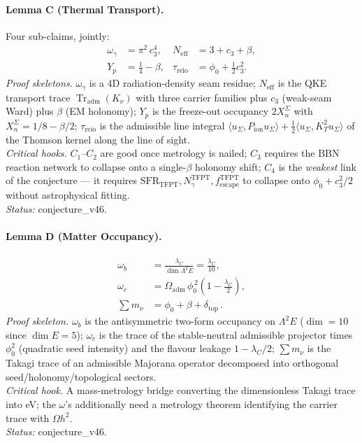 \documentclass[11pt,a4paper]{article}
\begin{document}
\paragraph{Lemma C (Thermal Transport).}
Four sub-claims, jointly:
\begin{align}
\omega_\gamma &= \pi^2\,c_3^4, &
N_{\mathrm{eff}} &= 3 + c_3 + \beta, \nonumber\\
Y_p &= \tfrac14 - \beta, &
\tau_{\mathrm{reio}} &= \phi_0 + \tfrac12 c_3^2 .
\label{eq:lemmaC}
\end{align}
\emph{Proof skeletons.}
\(\omega_\gamma\) is a 4D radiation-density seam residue;
\(N_{\mathrm{eff}}\) is the QKE transport trace
\(\operatorname{Tr}_{\mathrm{adm}}(K_\nu)\) with three carrier
families plus \(c_3\) (weak-seam Ward) plus \(\beta\) (EM holonomy);
\(Y_p\) is the freeze-out occupancy \(2 X_n^\Sigma\) with
\(X_n^\Sigma = 1/8 - \beta/2\); \(\tau_{\mathrm{reio}}\) is the
admissible line integral
\(\langle u_\Sigma,P_{\mathrm{ion}} u_\Sigma\rangle
+\tfrac12 \langle u_\Sigma, K_T^2 u_\Sigma\rangle\) of the Thomson
kernel along the line of sight.\\
\emph{Critical hooks.} \(C_1\)--\(C_2\) are good once metrology is
nailed; \(C_3\) requires the BBN reaction network to collapse onto a
single-\(\beta\) holonomy shift; \(C_4\) is the
\emph{weakest} link of the conjecture --- it requires
\(\mathrm{SFR}_{\mathrm{TFPT}},
N_\gamma^{\mathrm{TFPT}}, f_{\mathrm{escape}}^{\mathrm{TFPT}}\) to
collapse onto \(\phi_0+c_3^2/2\) without astrophysical fitting.\\
\emph{Status:} \textsf{conjecture\_v46}.

\paragraph{Lemma D (Matter Occupancy).}
\begin{align}
\omega_b &= \frac{\lambda_C}{\dim \Lambda^2 E} = \frac{\lambda_C}{10},
\nonumber\\
\omega_c &= \Omega_{\mathrm{adm}}\,\phi_0^{\,2}\!\left(1-\frac{\lambda_C}{2}\right),
\nonumber\\
\sum m_\nu &= \phi_0 + \beta + \delta_{\mathrm{top}} \,.
\label{eq:lemmaD}
\end{align}
\emph{Proof skeleton.} \(\omega_b\) is the antisymmetric two-form
occupancy on \(\Lambda^2 E\) (\(\dim=10\) since \(\dim E=5\));
\(\omega_c\) is the trace of the stable-neutral admissible projector
times \(\phi_0^2\) (quadratic seed intensity) and the flavour leakage
\(1-\lambda_C/2\); \(\sum m_\nu\) is the Takagi trace of an admissible
Majorana operator decomposed into orthogonal seed/holonomy/topological
sectors.\\
\emph{Critical hook.} A mass-metrology bridge converting the
dimensionless Takagi trace into eV; the \(\omega\)'s additionally need
a metrology theorem identifying the carrier trace with
\(\Omega h^2\).\\
\emph{Status:} \textsf{conjecture\_v46}.
\end{document}
